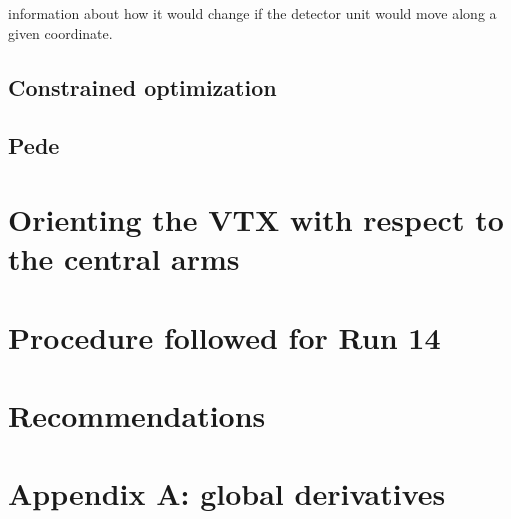 \documentclass[12pt]{article}
\begin{document}
information about how it would change if the detector unit would move along a given coordinate. 

\subsection{Constrained optimization}
\subsection{Pede}
\section{Orienting the VTX with respect to the central arms}
\section{Procedure followed for Run 14}
\section{Recommendations}
\section{Appendix A: global derivatives}
\end{document}
